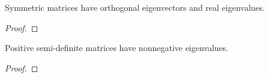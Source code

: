 
\begin{lemma}
    Symmetric matrices have orthogonal eigenvectors and real eigenvalues.
\end{lemma}
\begin{proof}
    
\end{proof}

\begin{lemma}
    Positive semi-definite matrices have nonnegative eigenvalues.
\end{lemma}
\begin{proof}
    
\end{proof}


